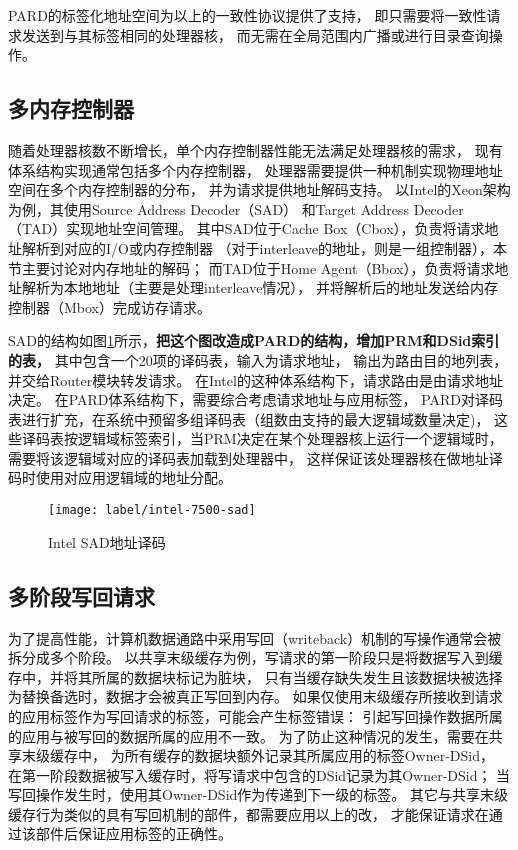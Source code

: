 PARD的标签化地址空间为以上的一致性协议提供了支持，
即只需要将一致性请求发送到与其标签相同的处理器核，
而无需在全局范围内广播或进行目录查询操作。



\subsection{多内存控制器}

随着处理器核数不断增长，单个内存控制器性能无法满足处理器核的需求，
现有体系结构实现通常包括多个内存控制器\cite{}，
处理器需要提供一种机制实现物理地址空间在多个内存控制器的分布，
并为请求提供地址解码支持。
以Intel的Xeon架构为例，其使用Source Address Decoder（SAD）
和Target Address Decoder（TAD）实现地址空间管理\cite{intel-xeon-7500}。
其中SAD位于Cache Box（Cbox），负责将请求地址解析到对应的I/O或内存控制器
（对于interleave的地址，则是一组控制器），本节主要讨论对内存地址的解码；
而TAD位于Home Agent（Bbox），负责将请求地址解析为本地地址（主要是处理interleave情况），
并将解析后的地址发送给内存控制器（Mbox）完成访存请求。

SAD的结构如图\ref{fig:intel-7500-sad}所示，\textbf{把这个图改造成PARD的结构，增加PRM和DSid索引的表，}
其中包含一个20项的译码表，输入为请求地址，
输出为路由目的地列表，并交给Router模块转发请求。
在Intel的这种体系结构下，请求路由是由请求地址决定。
在PARD体系结构下，需要综合考虑请求地址与应用标签，
PARD对译码表进行扩充，在系统中预留多组译码表（组数由支持的最大逻辑域数量决定)，
这些译码表按逻辑域标签索引，当PRM决定在某个处理器核上运行一个逻辑域时，
需要将该逻辑域对应的译码表加载到处理器中，
这样保证该处理器核在做地址译码时使用对应用逻辑域的地址分配。

\begin{figure}[tb]
  \centering
  \texttt{[image: label/intel-7500-sad]}
  \caption[Intel SAD地址译码]{Intel SAD地址译码}
  \label{fig:intel-7500-sad}
\end{figure}


\subsection{多阶段写回请求}

为了提高性能，计算机数据通路中采用写回（writeback）机制的写操作通常会被拆分成多个阶段。
以共享末级缓存为例，写请求的第一阶段只是将数据写入到缓存中，并将其所属的数据块标记为脏块，
只有当缓存缺失发生且该数据块被选择为替换备选时，数据才会被真正写回到内存。
如果仅使用末级缓存所接收到请求的应用标签作为写回请求的标签，可能会产生标签错误：
引起写回操作数据所属的应用与被写回的数据所属的应用不一致。
为了防止这种情况的发生，需要在共享末级缓存中，
为所有缓存的数据块额外记录其所属应用的标签Owner-DSid，
在第一阶段数据被写入缓存时，将写请求中包含的DSid记录为其Owner-DSid；
当写回操作发生时，使用其Owner-DSid作为传递到下一级的标签。
其它与共享末级缓存行为类似的具有写回机制的部件，都需要应用以上的改，
才能保证请求在通过该部件后保证应用标签的正确性。

